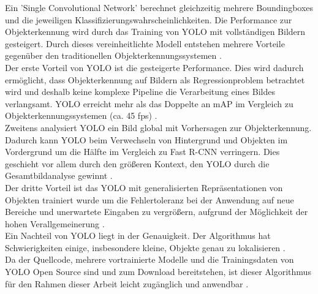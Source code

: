 {{	Ein 'Single Convolutional Network' berechnet gleichzeitig mehrere Boundingboxes und die jeweiligen Klassifizierungswahrscheinlichkeiten. Die Performance zur Objekterkennung wird durch das Training von YOLO mit vollständigen Bildern gesteigert. Durch dieses vereinheitlichte Modell entstehen mehrere Vorteile gegenüber den traditionellen Objekterkennungssystemen \citep{Plastiras2018}. \\
	Der erste Vorteil von YOLO ist die gesteigerte Performance. Dies wird dadurch ermöglicht, dass Objekterkennung auf Bildern als Regressionproblem betrachtet wird und deshalb keine komplexe Pipeline die Verarbeitung eines Bildes verlangsamt. YOLO erreicht mehr als das Doppelte an mAP  im Vergleich zu Objekterkennungssystemen (ca. 45 fps) \citep{Plastiras2018}. \\
	Zweitens analysiert YOLO ein Bild global mit Vorhersagen zur Objekterkennung. Dadurch kann YOLO beim Verwechseln von Hintergrund und Objekten im Vordergrund um die Hälfte im Vergleich zu Fast R-CNN verringern. Dies geschieht vor allem durch den größeren Kontext, den YOLO durch die Gesamtbildanalyse gewinnt \citep{Plastiras2018}. \\
	Der dritte Vorteil ist das YOLO mit generalisierten Repräsentationen von Objekten trainiert wurde um die Fehlertoleranz bei der Anwendung auf neue Bereiche und unerwartete Eingaben zu vergrößern, aufgrund der Möglichkeit der hohen Verallgemeinerung \citep{Plastiras2018}. \\
	Ein Nachteil von YOLO liegt in der Genauigkeit. Der Algorithmus hat Schwierigkeiten einige, insbesondere kleine, Objekte genau zu lokalisieren \citep{Plastiras2018}. \\
	Da der Quellcode, mehrere vortrainierte Modelle und die Trainingsdaten von YOLO Open Source sind und zum Download bereitstehen, ist dieser Algorithmus für den Rahmen dieser Arbeit leicht zugänglich und anwendbar \citep{Plastiras2018}. \\

}}
